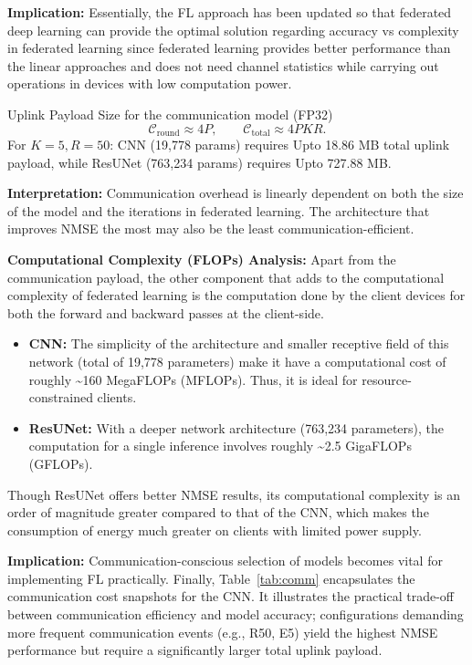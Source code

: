 \documentclass{llncs}
\begin{document}
\textbf{Implication:} Essentially, the FL approach has been updated so that federated deep learning can provide the optimal solution regarding accuracy vs complexity in federated learning since federated learning provides better performance than the linear approaches and does not need channel statistics while carrying out operations in devices with low computation power.

Uplink Payload Size for the communication model (FP32)
\begin{equation}
\mathcal{C}_{\text{round}}\approx 4P,\qquad
\mathcal{C}_{\text{total}}\approx 4PKR.
\end{equation}
For $K{=}5, R{=}50$: CNN (19,778 params) requires Upto 18.86 MB total uplink payload, while ResUNet (763,234 params) requires Upto 727.88 MB.

\textbf{Interpretation:} Communication overhead is linearly dependent on both the size of the model and the iterations in federated learning. The architecture that improves NMSE the most may also be the least communication-efficient.

\textbf{Computational Complexity (FLOPs) Analysis:} Apart from the communication payload, the other component that adds to the computational complexity of federated learning is the computation done by the client devices for both the forward and backward passes at the client-side.
\begin{itemize}
    \item \textbf{CNN:} The simplicity of the architecture and smaller receptive field of this network (total of 19,778 parameters) make it have a computational cost of roughly \textasciitilde 160 MegaFLOPs (MFLOPs). Thus, it is ideal for resource-constrained clients. 
    \item \textbf{ResUNet:} With a deeper network architecture (763,234 parameters), the
computation for a single inference involves roughly \textasciitilde 2.5 GigaFLOPs (GFLOPs).
\end{itemize}
Though ResUNet offers better NMSE results, its computational complexity is an order of magnitude greater compared to that of the CNN, which makes the consumption of energy much greater on clients with limited power supply.

\textbf{Implication:} Communication-conscious selection of models becomes vital for implementing FL practically. Finally, Table~\ref{tab:comm} encapsulates the communication cost snapshots for the CNN. It illustrates the practical trade-off between communication efficiency and model accuracy; configurations demanding more frequent communication events (e.g., R50, E5) yield the highest NMSE performance but require a significantly larger total uplink payload.
\end{document}
